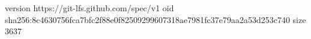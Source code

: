 version https://git-lfs.github.com/spec/v1
oid sha256:8c4630756fca7bfc2f88e0f82509299607318ae7981fc37e79aa2a53d253c740
size 3637
